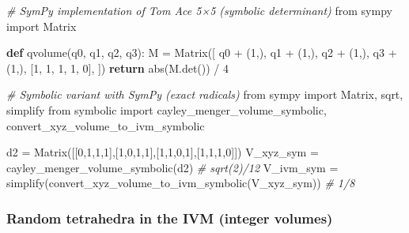 \documentclass[
  10pt,
]{article}
\newenvironment{Shaded}{}{}
\newcommand{\BuiltInTok}[1]{#1}
\newcommand{\CommentTok}[1]{\textcolor[rgb]{0.38,0.63,0.69}{\textit{#1}}}
\newcommand{\ControlFlowTok}[1]{\textcolor[rgb]{0.00,0.44,0.13}{\textbf{#1}}}
\newcommand{\DecValTok}[1]{\textcolor[rgb]{0.25,0.63,0.44}{#1}}
\newcommand{\ImportTok}[1]{#1}
\newcommand{\KeywordTok}[1]{\textcolor[rgb]{0.00,0.44,0.13}{\textbf{#1}}}
\newcommand{\NormalTok}[1]{#1}
\newcommand{\OperatorTok}[1]{\textcolor[rgb]{0.40,0.40,0.40}{#1}}
\begin{document}
\begin{Shaded}
\begin{Highlighting}[]
\CommentTok{\# SymPy implementation of Tom Ace 5×5 (symbolic determinant)}
\ImportTok{from}\NormalTok{ sympy }\ImportTok{import}\NormalTok{ Matrix}

\KeywordTok{def}\NormalTok{ qvolume(q0, q1, q2, q3):}
\NormalTok{    M }\OperatorTok{=}\NormalTok{ Matrix([}
\NormalTok{        q0 }\OperatorTok{+}\NormalTok{ (}\DecValTok{1}\NormalTok{,),}
\NormalTok{        q1 }\OperatorTok{+}\NormalTok{ (}\DecValTok{1}\NormalTok{,),}
\NormalTok{        q2 }\OperatorTok{+}\NormalTok{ (}\DecValTok{1}\NormalTok{,),}
\NormalTok{        q3 }\OperatorTok{+}\NormalTok{ (}\DecValTok{1}\NormalTok{,),}
\NormalTok{        [}\DecValTok{1}\NormalTok{, }\DecValTok{1}\NormalTok{, }\DecValTok{1}\NormalTok{, }\DecValTok{1}\NormalTok{, }\DecValTok{0}\NormalTok{],}
\NormalTok{    ])}
    \ControlFlowTok{return} \BuiltInTok{abs}\NormalTok{(M.det()) }\OperatorTok{/} \DecValTok{4}
\end{Highlighting}
\end{Shaded}

\begin{Shaded}
\begin{Highlighting}[]
\CommentTok{\# Symbolic variant with SymPy (exact radicals)}
\ImportTok{from}\NormalTok{ sympy }\ImportTok{import}\NormalTok{ Matrix, sqrt, simplify}
\ImportTok{from}\NormalTok{ symbolic }\ImportTok{import}\NormalTok{ cayley\_menger\_volume\_symbolic, convert\_xyz\_volume\_to\_ivm\_symbolic}

\NormalTok{d2 }\OperatorTok{=}\NormalTok{ Matrix([[}\DecValTok{0}\NormalTok{,}\DecValTok{1}\NormalTok{,}\DecValTok{1}\NormalTok{,}\DecValTok{1}\NormalTok{],[}\DecValTok{1}\NormalTok{,}\DecValTok{0}\NormalTok{,}\DecValTok{1}\NormalTok{,}\DecValTok{1}\NormalTok{],[}\DecValTok{1}\NormalTok{,}\DecValTok{1}\NormalTok{,}\DecValTok{0}\NormalTok{,}\DecValTok{1}\NormalTok{],[}\DecValTok{1}\NormalTok{,}\DecValTok{1}\NormalTok{,}\DecValTok{1}\NormalTok{,}\DecValTok{0}\NormalTok{]])}
\NormalTok{V\_xyz\_sym }\OperatorTok{=}\NormalTok{ cayley\_menger\_volume\_symbolic(d2)      }\CommentTok{\# sqrt(2)/12}
\NormalTok{V\_ivm\_sym }\OperatorTok{=}\NormalTok{ simplify(convert\_xyz\_volume\_to\_ivm\_symbolic(V\_xyz\_sym))  }\CommentTok{\# 1/8}
\end{Highlighting}
\end{Shaded}

\hypertarget{random-tetrahedra-in-the-ivm-integer-volumes}{%
\subsubsection{Random tetrahedra in the IVM (integer
volumes)}\label{random-tetrahedra-in-the-ivm-integer-volumes}}
\end{document}
